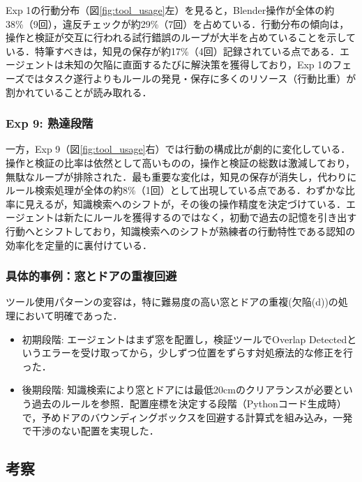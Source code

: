 \documentclass[dvipdfmx, a4paper, 9pt]{deimj}
\begin{document}
Exp 1の行動分布（図\ref{fig:tool_usage}左）を見ると，Blender操作が全体の約38\%（9回），違反チェックが約29\%（7回）を占めている．行動分布の傾向は，操作と検証が交互に行われる試行錯誤のループが大半を占めていることを示している．特筆すべきは，知見の保存が約17\%（4回）記録されている点である．エージェントは未知の欠陥に直面するたびに解決策を獲得しており，Exp 1のフェーズではタスク遂行よりもルールの発見・保存に多くのリソース（行動比重）が割かれていることが読み取れる．

\subsubsection{Exp 9: 熟達段階}

一方，Exp 9（図\ref{fig:tool_usage}右）では行動の構成比が劇的に変化している．操作と検証の比率は依然として高いものの，操作と検証の総数は激減しており，無駄なループが排除された．最も重要な変化は，知見の保存が消失し，代わりにルール検索処理が全体の約8\%（1回）として出現している点である．わずかな比率に見えるが，知識検索へのシフトが，その後の操作精度を決定づけている．エージェントは新たにルールを獲得するのではなく，初動で過去の記憶を引き出す行動へとシフトしており，知識検索へのシフトが熟練者の行動特性である認知の効率化を定量的に裏付けている．

\subsubsection{具体的事例：窓とドアの重複回避}

ツール使用パターンの変容は，特に難易度の高い窓とドアの重複(欠陥(d))の処理において明確であった．

\begin{itemize}
  \item 初期段階: エージェントはまず窓を配置し，検証ツールでOverlap Detectedというエラーを受け取ってから，少しずつ位置をずらす対処療法的な修正を行った．
  \item 後期段階: 知識検索により窓とドアには最低20cmのクリアランスが必要という過去のルールを参照．配置座標を決定する段階（Pythonコード生成時）で，予めドアのバウンディングボックスを回避する計算式を組み込み，一発で干渉のない配置を実現した．
\end{itemize}

\subsection{考察}
\end{document}
